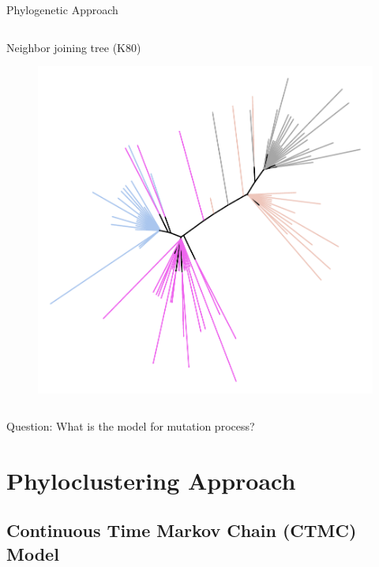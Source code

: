 \documentclass{beamer}
\begin{document}
\begin{frame}{Phylogenetic Approach}
\begin{columns}
\begin{column}{0.5\textwidth}
  \begin{center}
  \small Neighbor joining tree (K80)
  \vspace{-0.5cm}
  \begin{figure}
  \includegraphics[width=1.05\textwidth]{./graph/seq-2_nj_K80}
  \end{figure}
  \end{center}
\end{column}

\end{columns}

\begin{center}
\color{mydarkred}
Question: What is the model for mutation process?
\end{center}

\end{frame}


\section{Phyloclustering Approach}

\subsection{Continuous Time Markov Chain (CTMC) Model}
\end{document}
